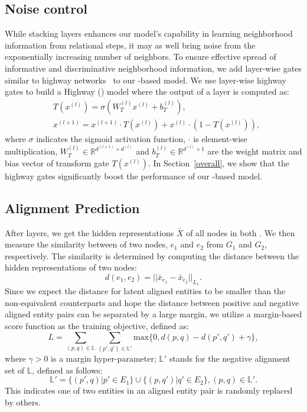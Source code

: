 	\subsection{Noise control}
	\label{section:hgcn}
	While stacking \RGCN layers enhances our model's capability in learning neighborhood information from relational steps, it may as well
bring noise from the exponentially increasing number of neighbors. To ensure effective spread of informative and discriminative
neighborhood information, we add layer-wise gates similar to highway networks~\cite{Srivastava2015Highway} to our \RGCN-based model.
We use layer-wise highway gates to build a Highway \RGCN (\HRGCN) model where the output of a \HRGCN layer is computed as:
	\begin{equation}
	\begin{split}
	&T(x^{(l)})=\sigma(W_T^{(l)}x^{(l)}+b_T^{(l)}), \\
	&x^{(l+1)}=x^{(l+1)} \cdot T(x^{(l)})+x^{(l)} \cdot (1-T(x^{(l)})),
	\end{split}
	\end{equation}
	where $\sigma$ indicates the sigmoid activation function, $\cdot$ is element-wise multiplication, $W_T^{(l)} \in \mathbb{R}^{d^{(l+1)}
\times d^{(l)}}$ and $b_T^{(l)} \in \mathbb{R}^{d^{(l)} \times 1}$ are the weight matrix and bias vector of transform gate $T(x^{(l)})$.
    In Section~\ref{overall}, we show that the highway gates significantly boost the performance of our \RGCN-based model.
	
	\subsection{Alignment Prediction\label{prediction}}
	After \HRGCN layers, we get the hidden representations $\bar{X}$ of all nodes in both \KGs. We then measure the similarity between of two
nodes, $e_1$ and $e_2$ from $G_1$ and $G_2$, respectively. The similarity is determined by computing the distance between the hidden
representations of two nodes:
	\begin{equation}
	\label{d}
	d(e_1,e_2)=||\bar{x}_{e_1}-\bar{x}_{e_2}||_{L_1}.
	\end{equation}
	Since we expect the distance for latent aligned entities to be smaller than the non-equivalent counterparts and hope the distance between positive and negative aligned entity pairs can be separated by a large margin, we utilize a margin-based score function as the training objective, defined as:
	\begin{equation}
	L=\sum\limits_{(p,q)\in \mathbb{L}}\sum\limits_{(p',q')\in \mathbb{L'}}\mathrm{max}\{0,d(p,q)-d(p',q')+\gamma\},
	\end{equation}
	where $\gamma > 0$ is a margin hyper-parameter; $\mathbb{L'}$ stands for the negative alignment set of $\mathbb{L}$, defined as follows:
	\begin{equation}
	\mathbb{L'}=\{(p',q)|p'\in E_1\}\cup\{(p,q')|q'\in E_2\}, (p,q)\in \mathbb{L'}.
	\end{equation}
	This indicates one of two entities in an aligned entity pair is randomly replaced by others.
	
